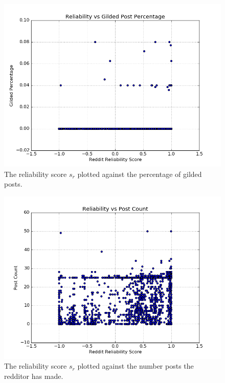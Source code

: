 \begin{figure}[tb]
    \centering
    \includegraphics[width=\linewidth]{figures/reliability_gilded.png}
    \caption{The reliability score $s_r$ plotted against the percentage of gilded posts.}
    \label{fig:reliability_gilded}
\end{figure}

\begin{figure}[tb]
    \centering
    \includegraphics[width=\linewidth]{figures/reliability_post_count.png}
    \caption{The reliability score $s_r$ plotted against the number posts the redditor has made.}
    \label{fig:reliability_post_count}
\end{figure}

